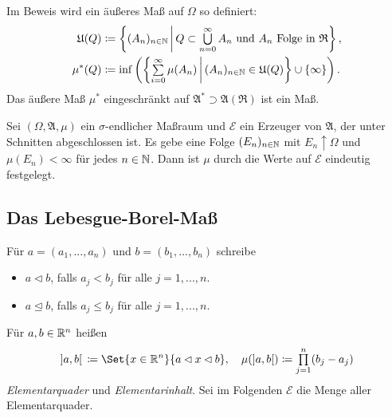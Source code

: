 \documentclass{cheat-sheet}
\newcommand{\Alg}{\mathfrak{A}} %
\newcommand{\Ring}{\mathfrak{R}} %
\theoremstyle{definition}
\begin{document}
\begin{bem}
  Im Beweis wird ein äußeres Maß auf $\Omega$ so definiert:
  \begin{align*}
    \mathfrak{U}(Q) &\coloneqq \left\{ (A_n)_{n \in \N} \,\middle|\, Q \subset \bigcup_{n = 0}^\infty A_n \text{ und } A_n \text{ Folge in } \Ring \right\}, \\
    \mu^*(Q) &\coloneqq \inf \left( \left\{ \sum_{i = 0}^\infty \mu(A_n) \,\middle|\, (A_n)_{n \in \N} \in \mathfrak{U}(Q) \right\} \cup \{ \infty \} \right).
  \end{align*}
  Das äußere Maß $\mu^*$ eingeschränkt auf $\Alg^* \supset \Alg(\Ring)$ ist ein Maß.
\end{bem}

\begin{satz}
  Sei $(\Omega, \Alg, \mu)$ ein $\sigma$-endlicher Maßraum und $\mathcal{E}$ ein Erzeuger von $\Alg$, der unter Schnitten abgeschlossen ist. Es gebe eine Folge $(E_n)_{n \in \mathbb{N}}$ mit $E_n \uparrow \Omega$ und $\mu(E_n) < \infty$ für jedes $n \in \mathbb{N}$. Dann ist $\mu$ durch die Werte auf $\mathcal{E}$ eindeutig festgelegt.
\end{satz}

\begin{samepage}

\subsection{Das Lebesgue-Borel-Maß}

\begin{nota}
  Für $a = (a_1, ..., a_n)$ und $b = (b_1, ..., b_n)$ schreibe
  \begin{itemize}
    \item $a \lhd b$, falls $a_j < b_j$ für alle $j = 1, ..., n$.
    \item $a \unlhd b$, falls $a_j \leq b_j$ für alle $j = 1, ..., n$.
  \end{itemize}
\end{nota}

\end{samepage}

\begin{defn}
  Für $a, b \in \mathbb{R}^n$ heißen
  \[
    \left]a, b\right[\,\coloneqq \Set{ x \in \R^n }{ a \lhd x \lhd b }, \quad
    \mu(\left]a, b\right[) \coloneqq \prod_{j = 1}^{n} (b_j - a_j)
  \]
  \emph{Elementarquader} und \emph{Elementarinhalt}. Sei im Folgenden $\mathcal{E}$ die Menge aller Elementarquader.
\end{defn}
\end{document}
